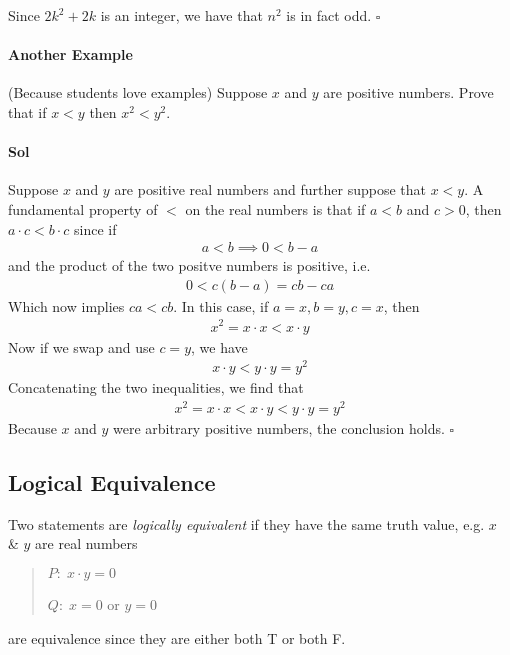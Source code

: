 \documentclass[../main.tex]{subfiles}
\begin{document}
Since $2k^2 + 2k$ is an integer, we have that $n^2$ is in fact odd. $\square$

\paragraph{Another Example} (Because students love examples)
Suppose $x$ and $y$ are positive numbers. Prove that if $x < y$ then $x^2 < y^2$.

\paragraph{Sol}

Suppose $x$ and $y$ are positive real numbers and further suppose that $x < y$. A fundamental
property of $<$ on the real numbers is that if $a < b$ and $c > 0$, then $a \cdot c < b \cdot c$
since if 
\begin{align*}
    a < b \implies 0 < b - a
\end{align*}
and the product of the two positve numbers is positive, i.e.
\begin{align*}
    0 < c(b - a) = c b - c a
\end{align*}
Which now implies $ca < cb$. In this case, if $a = x, b = y, c = x$, then
\begin{align*}
    x^2 = x \cdot x < x \cdot y
\end{align*}
Now if we swap and use $c = y$, we have
\begin{align*}
    x \cdot y < y \cdot y = y^2
\end{align*}
Concatenating the two inequalities, we find that
\begin{align*}
    x^2 = x \cdot x < x \cdot y < y \cdot y = y^2
\end{align*}
Because $x$ and $y$ were arbitrary positive numbers, the conclusion holds. $\square$

\subsection{Logical Equivalence}

Two statements are \emph{logically equivalent} if they have the same truth value, e.g. $x$ \& $y$
are real numbers
\begin{quote}
    $P: \; x \cdot y = 0$

    $Q: \; x = 0$ or $y = 0$
\end{quote}
are equivalence since they are either both T or both F.

\paragraph{}
\end{document}
